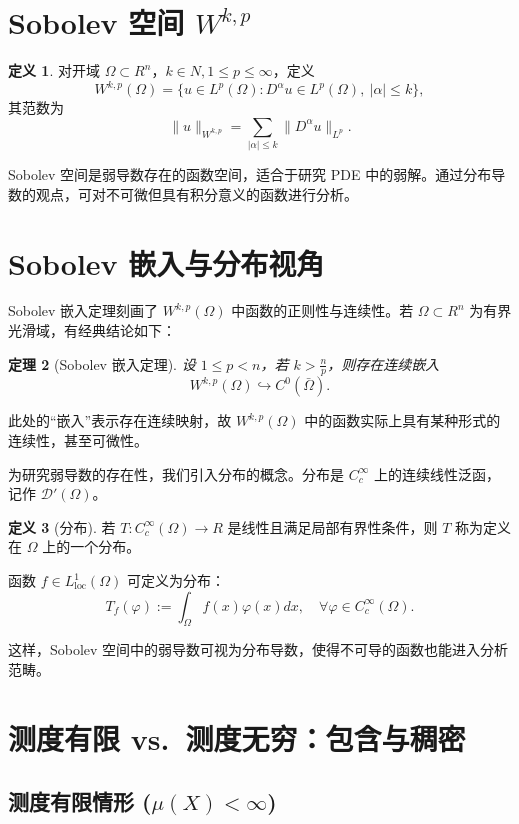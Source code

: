 \documentclass[12pt,a4paper]{article}
\newcommand{\diff}{\mathop{}\!\mathrm{d}}  %
\newcommand{\R}{\mathbb{R}}                %
\newcommand{\N}{\mathbb{N}}                %
\def\R{R}%
\def\N{N}%
\def\diff{d}%
\theoremstyle{plain}
\newtheorem{theorem}{定理}[section]
\theoremstyle{definition}
\newtheorem{definition}[theorem]{定义}
\theoremstyle{remark}
\begin{document}
\section{Sobolev 空间 $W^{k,p}$}

\begin{definition}
对开域 $\Omega\subset\R^n$，$k\in\N,1\le p\le\infty$，定义
\[
W^{k,p}(\Omega)
=\{u\in L^p(\Omega):D^\alpha u\in L^p(\Omega),\ |\alpha|\le k\},
\]
其范数为
\[
\|u\|_{W^{k,p}}
=\sum_{|\alpha|\le k}\|D^\alpha u\|_{L^p}.
\]
\end{definition}

Sobolev 空间是弱导数存在的函数空间，适合于研究 PDE 中的弱解。通过分布导数的观点，可对不可微但具有积分意义的函数进行分析。

\section{Sobolev 嵌入与分布视角}

Sobolev 嵌入定理刻画了 $W^{k,p}(\Omega)$ 中函数的正则性与连续性。若 $\Omega\subset\R^n$ 为有界光滑域，有经典结论如下：

\begin{theorem}[Sobolev 嵌入定理]
设 $1\le p<n$，若 $k>\frac{n}{p}$，则存在连续嵌入
\[
W^{k,p}(\Omega)\hookrightarrow C^0(\bar\Omega).
\]
\end{theorem}

此处的“嵌入”表示存在连续映射，故 $W^{k,p}(\Omega)$ 中的函数实际上具有某种形式的连续性，甚至可微性。

为研究弱导数的存在性，我们引入分布的概念。分布是 $C_c^\infty$ 上的连续线性泛函，记作 $\mathcal D'(\Omega)$。

\begin{definition}[分布]
若 $T:C_c^\infty(\Omega)\to\R$ 是线性且满足局部有界性条件，则 $T$ 称为定义在 $\Omega$ 上的一个分布。
\end{definition}

函数 $f\in L^1_{\text{loc}}(\Omega)$ 可定义为分布：
\[
T_f(\varphi):=\int_\Omega f(x)\varphi(x)\diff x,\quad\forall\varphi\in C_c^\infty(\Omega).
\]

这样，Sobolev 空间中的弱导数可视为分布导数，使得不可导的函数也能进入分析范畴。

\section{测度有限 vs.\ 测度无穷：包含与稠密}

\subsection{测度有限情形 ($\mu(X)<\infty$)}
\end{document}
